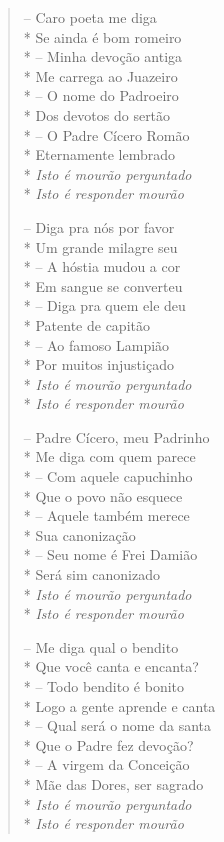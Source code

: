 \begin{verse}
-- Caro poeta me diga\\*
Se ainda é bom romeiro\\*
-- Minha devoção antiga\\*
Me carrega ao Juazeiro\\*
-- O nome do Padroeiro\\*
Dos devotos do sertão\\*
-- O Padre Cícero Romão\\*
Eternamente lembrado\\*
\textit{Isto é mourão perguntado}\\*
\textit{Isto é responder mourão}

-- Diga pra nós por favor\\*
Um grande milagre seu\\*
-- A hóstia mudou a cor\\*
Em sangue se converteu\\*
-- Diga pra quem ele deu\\*
Patente de capitão\\*
-- Ao famoso Lampião\\*
Por muitos injustiçado\\*
\textit{Isto é mourão perguntado}\\*
\textit{Isto é responder mourão}

-- Padre Cícero, meu Padrinho\\*
Me diga com quem parece\\*
-- Com aquele capuchinho\\*
Que o povo não esquece\\*
-- Aquele também merece\\*
Sua canonização\\*
-- Seu nome é Frei Damião\\*
Será sim canonizado\\*
\textit{Isto é mourão perguntado}\\*
\textit{Isto é responder mourão}

-- Me diga qual o bendito\\*
Que você canta e encanta?\\*
-- Todo bendito é bonito\\*
Logo a gente aprende e canta\\*
-- Qual será o nome da santa\\*
Que o Padre fez devoção?\\*
-- A virgem da Conceição\\*
Mãe das Dores, ser sagrado\\*
\textit{Isto é mourão perguntado}\\*
\textit{Isto é responder mourão}


\end{verse}
